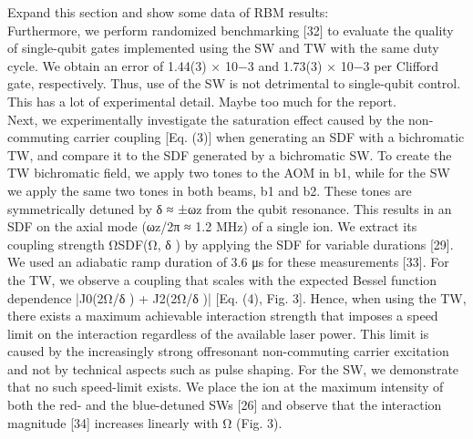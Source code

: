 \documentclass{article}
\begin{document}
    Expand this section and show some data of RBM results:\\
    Furthermore, we perform randomized benchmarking [32] to evaluate
    the quality of single-qubit gates implemented using the SW and TW
    with the same duty cycle. We obtain an error of 1.44(3) × 10−3 and
    1.73(3) × 10−3 per Clifford gate, respectively. Thus, use of the
    SW is not detrimental to single-qubit control. \\

    This has a lot of experimental detail. Maybe too much for the report.\\
    Next, we experimentally investigate the saturation effect caused
    by the non-commuting carrier coupling [Eq. (3)] when generating an
    SDF with a bichromatic TW, and compare it to the SDF generated by
    a bichromatic SW. To create the TW bichromatic field, we apply two
    tones to the AOM in b1, while for the SW we apply the same two
    tones in both beams, b1 and b2. These tones are symmetrically
    detuned by δ ≈ ±ωz from the qubit resonance. This results in an
    SDF on the axial mode (ωz/2π ≈ 1.2 MHz) of a single ion. We
    extract its coupling strength ΩSDF(Ω, δ ) by applying the SDF for
    variable durations [29]. We used an adiabatic ramp duration of 3.6
    μs for these measurements [33]. For the TW, we observe a coupling
    that scales with the expected Bessel function dependence |J0(2Ω/δ
    ) + J2(2Ω/δ )| [Eq. (4), Fig. 3]. Hence, when using the TW, there
    exists a maximum achievable interaction strength that imposes a
    speed limit on the interaction regardless of the available laser
    power. This limit is caused by the increasingly strong offresonant
    non-commuting carrier excitation and not by technical aspects such
    as pulse shaping. For the SW, we demonstrate that no such
    speed-limit exists. We place the ion at the maximum intensity of
    both the red- and the blue-detuned SWs [26] and observe that the
    interaction magnitude [34] increases linearly with Ω (Fig. 3).\\
\end{document}
